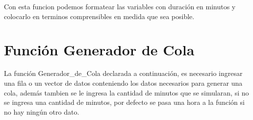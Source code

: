 \documentclass[]{article}
\newenvironment{Shaded}{\begin{snugshade}}{\end{snugshade}}
\newcommand{\ControlFlowTok}[1]{\textcolor[rgb]{0.13,0.29,0.53}{\textbf{#1}}}
\newcommand{\DataTypeTok}[1]{\textcolor[rgb]{0.13,0.29,0.53}{#1}}
\newcommand{\DecValTok}[1]{\textcolor[rgb]{0.00,0.00,0.81}{#1}}
\newcommand{\KeywordTok}[1]{\textcolor[rgb]{0.13,0.29,0.53}{\textbf{#1}}}
\newcommand{\NormalTok}[1]{#1}
\newcommand{\OperatorTok}[1]{\textcolor[rgb]{0.81,0.36,0.00}{\textbf{#1}}}
\newcommand{\StringTok}[1]{\textcolor[rgb]{0.31,0.60,0.02}{#1}}
\begin{document}
Con esta funcion podemos formatear las variables con duración en minutos
y colocarlo en terminos comprensibles en medida que sea posible.

\begin{Shaded}
\end{Shaded}

\hypertarget{funcion-generador-de-cola}{%
\section{Función Generador de Cola}\label{funcion-generador-de-cola}}

La función Generador\_de\_Cola declarada a continuación, es necesario
ingresar una fila o un vector de datos conteniendo los datos necesarios
para generar una cola, además tambien se le ingresa la cantidad de
minutos que se simularan, si no se ingresa una cantidad de minutos, por
defecto se pasa una hora a la función si no hay ningún otro dato.
\end{document}
